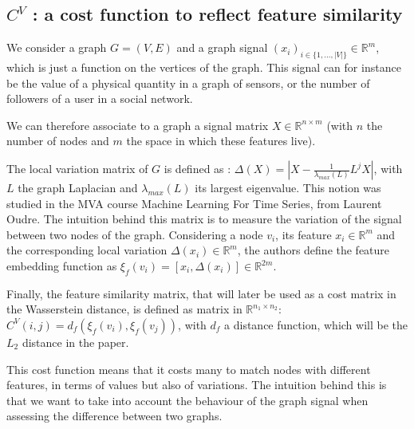 \documentclass[a4paper,11pt]{article}
\begin{document}
\subsection{$C^V$ : a cost function to reflect feature similarity}
\label{CV}
We consider a graph $G=(V, E)$ and a graph signal $(x_i)_{i \in \{1, ..., |V| \} } \in \mathbb{R}^m$, which is just a function on the vertices of the graph. 
This signal can for instance be the value of a physical quantity in a graph of sensors, or the number of followers of a user in a social network.

We can therefore associate to a graph a signal matrix $X \in \mathbb{R}^{n \times m}$ (with $n$ the number of nodes and $m$ the space in which these features live).

The local variation matrix of $G$ is defined as : $\Delta(X) = | X - \frac{1}{\lambda_{max}(L)} L^j X  |$, with $L$ the graph Laplacian and $\lambda_{max}(L)$ its largest eigenvalue.
This notion was studied in the MVA course Machine Learning For Time Series, from Laurent Oudre. 
The intuition behind this matrix is to measure the variation of the signal between two nodes of the graph.
Considering a node $v_i$, its feature $x_i \in \mathbb{R}^m$ and the corresponding local variation $\Delta(x_i) \in \mathbb{R}^m$, the authors define the feature embedding function as $\xi_f(v_i) = [x_i, \Delta(x_i)] \in \mathbb{R}^{2m}$.

Finally, the feature similarity matrix, that will later be used as a cost matrix in the Wasserstein distance, is defined as  matrix in $\mathbb{R}^{n_1 \times n_2}$: $C^V(i,j) = d_f(\xi_f(v_i), \xi_f(v_j)) $, with $d_f$ a distance function, which will be the $L_2$ distance in the paper.

This cost function means that it costs many to match nodes with different features, in terms of values but also of variations. 
The intuition behind this is that we want to take into account the behaviour of the graph signal when assessing the difference between two graphs.
\end{document}
